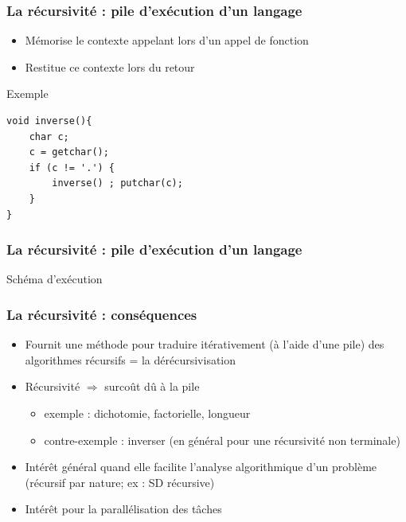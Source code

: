 \documentclass[table,handout,tikz,12pt,svgnames]{beamer}
\begin{document}
\begin{frame}[fragile=singleslide]
	\frametitle{La récursivité : pile d'exécution d'un langage}
	\vspace{-0.2cm}
	\begin{block}{}
		\begin{itemize}
			\item Mémorise le contexte appelant lors d'un appel de fonction
			\item Restitue ce contexte lors du retour
		\end{itemize}
	\end{block}
	\begin{block}{Exemple} %
		\begin{verbatim}
void inverse(){
	char c;
	c = getchar();
	if (c != '.') {
		inverse() ; putchar(c);
	}
}
		\end{verbatim}
	\end{block}
\end{frame}

\begin{frame}[fragile=singleslide]
	\frametitle{La récursivité : pile d'exécution d'un langage}
	\vspace{-4cm}
	\begin{block}{Schéma d'exécution}
	\end{block}
\end{frame}

\begin{frame}[fragile=singleslide]
	\frametitle{La récursivité : conséquences}
	\vspace{-0.2cm}
	\begin{block}{}
		\begin{itemize}
			\item Fournit une méthode pour traduire itérativement (à l'aide d'une pile) des
			algorithmes récursifs = la dérécursivisation
			\item Récursivité $\Rightarrow$ surcoût dû à la pile
			\begin{itemize}
				\item exemple : dichotomie, factorielle, longueur
				\item contre-­exemple : inverser (en général pour une récursivité non terminale)
			\end{itemize}
			\item Intérêt général quand elle facilite l'analyse algorithmique d'un problème (récursif par nature; ex : SD récursive)
			\item Intérêt pour la parallélisation des tâches
		\end{itemize}
	\end{block}
\end{frame}
\end{document}
